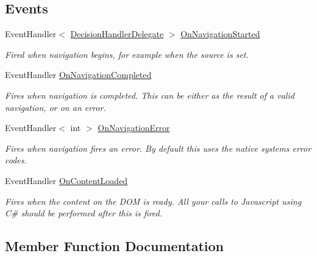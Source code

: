 \subsection*{Events}
\begin{DoxyCompactItemize}
\item 
Event\+Handler$<$ \hyperlink{class_xam_1_1_plugin_1_1_web_view_1_1_abstractions_1_1_delegates_1_1_decision_handler_delegate}{Decision\+Handler\+Delegate} $>$ \hyperlink{class_xam_1_1_plugin_1_1_web_view_1_1_abstractions_1_1_forms_web_view_a87f3b76fb88fd4467d6f8f715af1645d}{On\+Navigation\+Started}
\begin{DoxyCompactList}\small\item\em Fired when navigation begins, for example when the source is set. \end{DoxyCompactList}\item 
Event\+Handler \hyperlink{class_xam_1_1_plugin_1_1_web_view_1_1_abstractions_1_1_forms_web_view_a476e9a105fd707e0567b7049e71983f2}{On\+Navigation\+Completed}
\begin{DoxyCompactList}\small\item\em Fires when navigation is completed. This can be either as the result of a valid navigation, or on an error. \end{DoxyCompactList}\item 
Event\+Handler$<$ int $>$ \hyperlink{class_xam_1_1_plugin_1_1_web_view_1_1_abstractions_1_1_forms_web_view_a7c716b3098bfaa7c557ec49b89175055}{On\+Navigation\+Error}
\begin{DoxyCompactList}\small\item\em Fires when navigation fires an error. By default this uses the native systems error codes. \end{DoxyCompactList}\item 
Event\+Handler \hyperlink{class_xam_1_1_plugin_1_1_web_view_1_1_abstractions_1_1_forms_web_view_a822187ab3d98544ee6791706945ab303}{On\+Content\+Loaded}
\begin{DoxyCompactList}\small\item\em Fires when the content on the D\+OM is ready. All your calls to Javascript using C\# should be performed after this is fired. \end{DoxyCompactList}\end{DoxyCompactItemize}


\subsection{Member Function Documentation}
\mbox{\label{class_xam_1_1_plugin_1_1_web_view_1_1_abstractions_1_1_forms_web_view_acb603d4eb33bfa2f459cddeee3911f8b}} 
